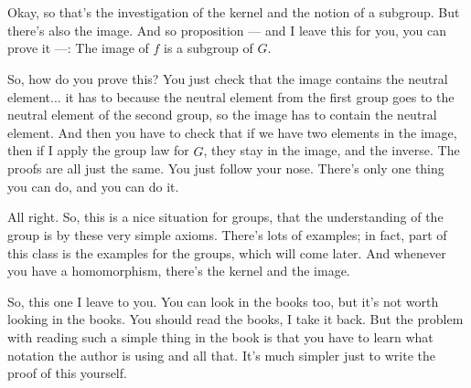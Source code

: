 \documentclass[11pt,a4paper]{report}
\theoremstyle{purplethm}
\theoremstyle{defthm}
\theoremstyle{examplethm}
\theoremstyle{remarkthm}
\theoremstyle{questionthm}
\theoremstyle{importantremarkthm}
\theoremstyle{purplethm}
\begin{document}
\begin{speech}[00:26:50 - 00:28:30]
Okay, so that's the investigation of the kernel and the notion of a subgroup. But there's also the image. And so proposition --- and I leave this for you, you can prove it ---: The image of $f$ is a subgroup of $\hat{G}$.

So, how do you prove this? You just check that the image contains the neutral element... it has to because the neutral element from the first group goes to the neutral element of the second group, so the image has to contain the neutral element. And then you have to check that if we have two elements in the image, then if I apply the group law for $\hat{G}$, they stay in the image, and the inverse. The proofs are all just the same. You just follow your nose. There's only one thing you can do, and you can do it.

All right. So, this is a nice situation for groups, that the understanding of the group is by these very simple axioms. There's lots of examples; in fact, part of this class is the examples for the groups, which will come later. And whenever you have a homomorphism, there's the kernel and the image.

So, this one I leave to you. You can look in the books too, but it's not worth looking in the books. You should read the books, I take it back. But the problem with reading such a simple thing in the book is that you have to learn what notation the author is using and all that. It's much simpler just to write the proof of this yourself.
\end{speech}
\end{document}
